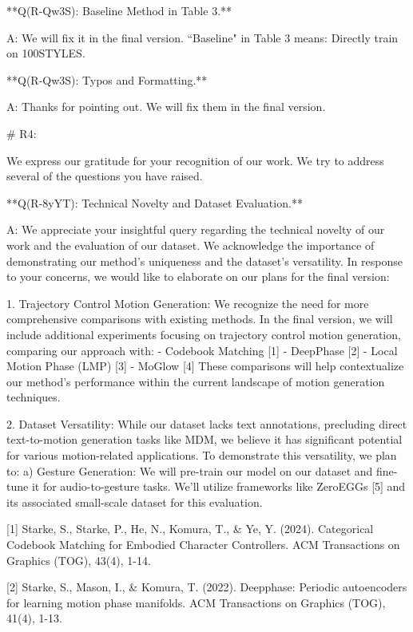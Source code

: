 **Q(R-Qw3S): Baseline Method in Table 3.**

A: We will fix it in the final version. ``Baseline" in Table 3 means: Directly train on 100STYLES.


**Q(R-Qw3S): Typos and Formatting.**

A: Thanks for pointing out. We will fix them in the final version.



# R4:


We express our gratitude for your recognition of our work. We try to address several of the questions you have raised.



**Q(R-8yYT): Technical Novelty and Dataset Evaluation.**

A: We appreciate your insightful query regarding the technical novelty of our work and the evaluation of our dataset. We acknowledge the importance of demonstrating our method's uniqueness and the dataset's versatility. In response to your concerns, we would like to elaborate on our plans for the final version:

1. Trajectory Control Motion Generation:
We recognize the need for more comprehensive comparisons with existing methods. In the final version, we will include additional experiments focusing on trajectory control motion generation, comparing our approach with:
    - Codebook Matching [1]
    - DeepPhase [2]
    - Local Motion Phase (LMP) [3]
    - MoGlow [4]
These comparisons will help contextualize our method's performance within the current landscape of motion generation techniques.

2. Dataset Versatility:
While our dataset lacks text annotations, precluding direct text-to-motion generation tasks like MDM, we believe it has significant potential for various motion-related applications. To demonstrate this versatility, we plan to:
a) Gesture Generation:
We will pre-train our model on our dataset and fine-tune it for audio-to-gesture tasks. We'll utilize frameworks like ZeroEGGs [5] and its associated small-scale dataset for this evaluation.



[1] Starke, S., Starke, P., He, N., Komura, T., & Ye, Y. (2024). Categorical Codebook Matching for Embodied Character Controllers. ACM Transactions on Graphics (TOG), 43(4), 1-14.

[2] Starke, S., Mason, I., & Komura, T. (2022). Deepphase: Periodic autoencoders for learning motion phase manifolds. ACM Transactions on Graphics (TOG), 41(4), 1-13.

